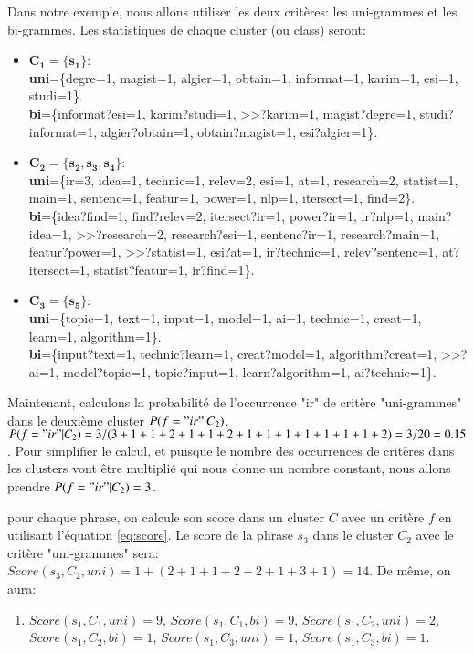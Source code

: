 \documentclass[a4paper,12pt,oneside]{../use/ESIthesis}
\begin{document}
\begin{kexp}
Dans notre exemple, nous allons utiliser les deux critères: les uni-grammes et les bi-grammes. 
Les statistiques de chaque cluster (ou class) seront:
\begin{itemize}
\item $\mathbf{C_1 = \{s_1\}} $:\\
\textbf{uni}=\{degre=1, magist=1, algier=1, obtain=1, informat=1, karim=1, esi=1, studi=1\}.\\
\textbf{bi}=\{informat?esi=1, karim?studi=1, >>?karim=1, magist?degre=1, studi?informat=1, algier?obtain=1, obtain?magist=1, esi?algier=1\}.

\item $ \mathbf{C_2 = \{s_2, s_3, s_4\}} $:\\
\textbf{uni}=\{ir=3, idea=1, technic=1, relev=2, esi=1, at=1, research=2, statist=1, main=1, sentenc=1, featur=1, power=1, nlp=1, itersect=1, find=2\}.\\
\textbf{bi}=\{idea?find=1, find?relev=2, itersect?ir=1, power?ir=1, ir?nlp=1, main?idea=1, >>?research=2, research?esi=1, sentenc?ir=1, research?main=1, featur?power=1, >>?statist=1, esi?at=1, ir?technic=1, relev?sentenc=1, at?itersect=1, statist?featur=1, ir?find=1\}.\\

\item $ \mathbf{C_3 = \{s_5\}} $:\\
\textbf{uni}=\{topic=1, text=1, input=1, model=1, ai=1, technic=1, creat=1, learn=1, algorithm=1\}.\\
\textbf{bi}=\{input?text=1, technic?learn=1, creat?model=1, algorithm?creat=1, >>?ai=1, model?topic=1, topic?input=1, learn?algorithm=1, ai?technic=1\}.
\end{itemize}

Maintenant, calculons la probabilité de l'occurrence "ir" de critère "uni-grammes" dans le deuxième cluster $ P(f = "ir" | C_2) $. 
$ P(f = "ir" | C_2) = 3/(3+1+1+2+1+1+2+1+1+1+1+1+1+1+2) = 3/20 = 0.15$. 
Pour simplifier le calcul, et puisque le nombre des occurrences de critères dans les clusters vont être multiplié qui nous donne un nombre constant, nous allons prendre $ P(f = "ir" | C_2) = 3 $.

pour chaque phrase, on calcule son score dans un cluster $ C $ avec un critère $ f $ en utilisant l'équation \ref{eq:score}. 
Le score de la phrase $ s_3 $ dans le cluster $ C_2 $ avec le critère "uni-grammes" sera: 
$ Score(s_3 , C_2 , uni ) = 1 + (2 + 1 + 1 + 2 + 2 + 1 + 3 + 1) = 14 $. 
De même, on aura:
\begin{enumerate}
\item $ Score(s_1 , C_1 , uni ) = 9 $, $ Score(s_1 , C_1 , bi ) = 9 $, 
$ Score(s_1 , C_2 , uni ) = 2 $, $ Score(s_1 , C_2 , bi ) = 1 $, 
$ Score(s_1 , C_3 , uni ) = 1 $, $ Score(s_1 , C_3 , bi ) = 1 $.


\end{enumerate}
\end{kexp}
\end{document}
